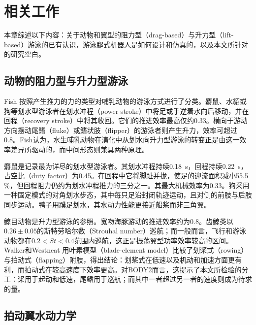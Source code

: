 \chapter{相关工作}
\label{ch:related}

本章综述以下内容：关于动物和翼型的阻力型（drag-based）与升力型（lift-based）游泳的已有认识，游泳腿式机器人是如何设计和仿真的，以及本文所针对的研究空白。

\section{动物的阻力型与升力型游泳}
\label{sec:rw-bio}

Fish \cite{Fish1996}按照产生推力的力的类型对哺乳动物的游泳方式进行了分类。麝鼠、水貂或狗等划水型游泳者在划水冲程（power stroke）中将足或手逆着水向后移动，并在回程（recovery stroke）中将其收回。它们的推进效率最高仅约0.33。横向于游动方向摆动尾鳍（fluke）或鳍状肢（flipper）的游泳者则产生升力，效率可超过0.8。Fish认为，水生哺乳动物在演化中从划水向升力型游泳的转变正是由这一效率差异所驱动的，而中间形态则兼具两种原理。

麝鼠是记录最为详尽的划水型游泳者\cite{Fish1984}。其划水冲程持续\SI{0.18}{\second}，回程持续\SI{0.22}{\second}，占空比（duty factor）为0.45。在回程中它将脚趾并拢，使足的迎流面积减小55.5\,\%，但回程阻力仍约为划水冲程推力的三分之一。其最大机械效率为0.33。狗采用一种固定模式的对角划水步态，其中每只足沿封闭轨迹运动，且对侧的前肢与后肢同步运动\cite{Fish2021DogPaddle}。鸭子用蹼足划水，其水动力性能更接近船桨而非三角翼\cite{Ribak2023}。

鲸目动物是升力型游泳的参照。宽吻海豚游动的推进效率约为0.8\cite{Fish1993}。齿鲸类以$0.26\pm0.05$的斯特劳哈尔数（Strouhal number）巡航\cite{Rohr2004}；而一般而言，飞行和游泳动物都在$0.2<\mathit{St}<0.4$范围内巡航，这正是振荡翼型功率效率较高的区间\cite{Taylor2003}。Walker和Westneat \cite{Walker2000}用叶素模型（blade-element model）比较了划桨式（rowing）与拍动式（flapping）附肢，得出结论：划桨式在低速以及机动和加速方面更有利，而拍动式在较高速度下效率更高。对BODY2而言，这提示了本文所检验的分工：桨用于起动和低速，尾鳍用于巡航；而其中一者超过另一者的速度则成为待求的量。

\section{拍动翼水动力学}
\label{sec:rw-foil}

